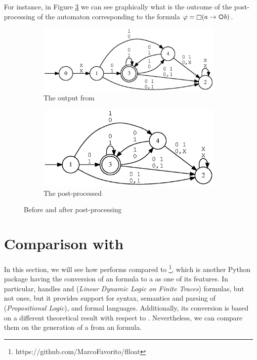 For instance, in Figure \ref{fig:pre-post-automaton} we can see graphically what is the outcome of the post-processing of the automaton corresponding to the formula $\varphi = \Always (a \rightarrow \Next b)$.
\begin{figure}[h]
\centering
\begin{subfigure}{.5\textwidth}
  \centering
  \includegraphics[width=\linewidth]{images/pre-automaton.eps}
  \caption{The \DFA output from \MONA}
  \label{fig:mona-output}
\end{subfigure}%
\begin{subfigure}{.5\textwidth}
  \centering
  \includegraphics[width=\linewidth]{images/post-automaton.eps}
  \caption{The \DFA post-processed}
  \label{fig:automa-post-processed}
\end{subfigure}
\caption{Before and after \DFA post-processing}
\label{fig:pre-post-automaton}
\end{figure}
\section{Comparison with \FLLOAT}
In this section, we will see how \LTLfToDFA performs compared to \href{https://pypi.org/project/flloat/}{\FLLOAT}\footnote{https://github.com/MarcoFavorito/flloat}, which is another Python package having the conversion of an \LTLf formula to a \DFA as one of its features.
In particular, \FLLOAT handles \LTLf and \LDLf (\textit{Linear Dynamic Logic on Finite Traces}) formulas, but not \PLTL ones, but it provides support for syntax, semantics and parsing of \PL (\textit{Propositional Logic}), \LTLf and \LDLf formal languages.  Additionally, its conversion is based on a different theoretical result with respect to \LTLfToDFA. Nevertheless, we can compare them on the generation of a \DFA from an \LTLf formula.

